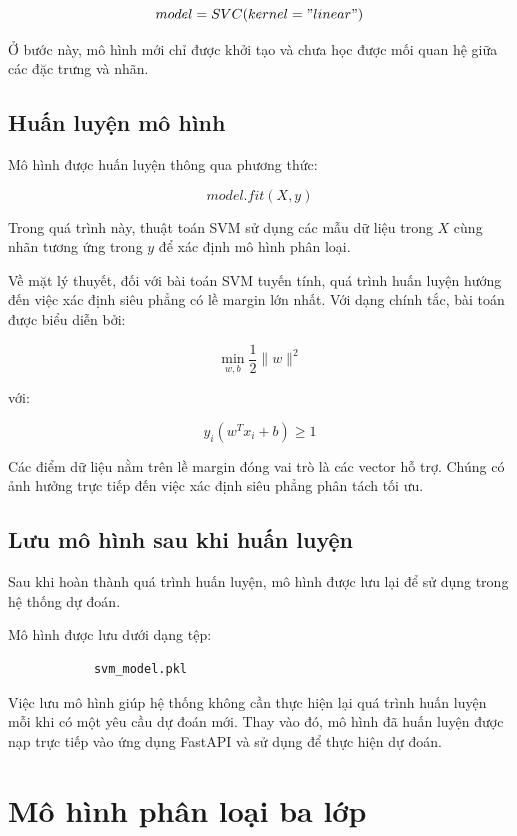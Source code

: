 \documentclass[12pt,a4paper]{report}
\begin{document}
		
		\[
		model = SVC(kernel="linear")
		\]

		
		Ở bước này, mô hình mới chỉ được khởi tạo và chưa học được mối quan hệ giữa các đặc trưng và nhãn.
		
		\subsection{Huấn luyện mô hình}
		
		Mô hình được huấn luyện thông qua phương thức:
		
	\[
			model.fit(X, y)
	\]
		
		Trong quá trình này, thuật toán SVM sử dụng các mẫu dữ liệu trong $X$ cùng nhãn tương ứng trong $y$ để xác định mô hình phân loại.
		
		Về mặt lý thuyết, đối với bài toán SVM tuyến tính, quá trình huấn luyện hướng đến việc xác định siêu phẳng có lề margin lớn nhất. Với dạng chính tắc, bài toán được biểu diễn bởi:
		
		$$
		\min_{w,b}
		\frac{1}{2}\|w\|^2
		$$
		
		với:
		
		$$
		y_i(w^Tx_i+b)\geq1
		$$
		
		Các điểm dữ liệu nằm trên lề margin đóng vai trò là các vector hỗ trợ.
		Chúng có ảnh hưởng trực tiếp đến việc xác định siêu phẳng phân tách tối ưu.
		
		\subsection{Lưu mô hình sau khi huấn luyện}
		
		Sau khi hoàn thành quá trình huấn luyện, mô hình được lưu lại để sử dụng trong hệ thống dự đoán.
		
		Mô hình được lưu dưới dạng tệp:
		
		\begin{verbatim}
			svm_model.pkl
		\end{verbatim}
		
		Việc lưu mô hình giúp hệ thống không cần thực hiện lại quá trình huấn luyện mỗi khi có một yêu cầu dự đoán mới. Thay vào đó, mô hình đã huấn luyện được
		nạp trực tiếp vào ứng dụng FastAPI và sử dụng để thực hiện dự đoán.
		
		
		
		\section{Mô hình phân loại ba lớp}
		
\end{document}
